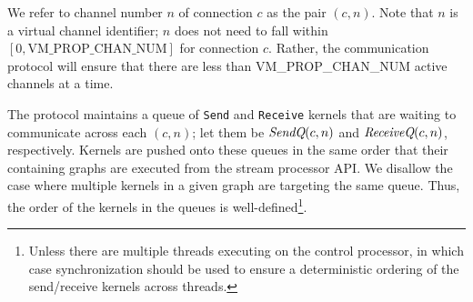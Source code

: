  We refer to channel number $n$ of connection $c$ as the pair $(c, n)$.
Note that $n$ is a virtual channel identifier; $n$ does not need to
fall within $[0, \mbox{VM\_PROP\_CHAN\_NUM}]$ for connection $c$.
Rather, the communication protocol will ensure that there are less
than VM\_PROP\_CHAN\_NUM active channels at a time.

The protocol maintains a queue of {\tt Send} and {\tt Receive} kernels
that are waiting to communicate across each $(c, n)$; let them be
$\mbox{\it SendQ}(c, n)$ and $\mbox{\it ReceiveQ}(c, n)$, respectively.  Kernels
are pushed onto these queues in the same order that their containing
graphs are executed from the stream processor API.  We disallow the
case where multiple kernels in a given graph are targeting the same
queue.  Thus, the order of the kernels in the queues is
well-defined\footnote{Unless there are multiple threads executing on
the control processor, in which case synchronization should be used to
ensure a deterministic ordering of the send/receive kernels across
threads.}.

